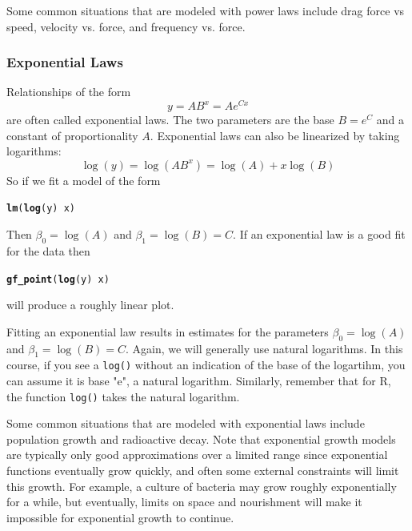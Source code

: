\documentclass[twoside]{book}\usepackage[]{graphicx}\usepackage[]{xcolor}
\makeatletter
\newcommand{\hlopt}[1]{\textcolor[rgb]{0,0,0}{#1}}%
\newcommand{\hlstd}[1]{\textcolor[rgb]{0.345,0.345,0.345}{#1}}%
\newcommand{\hlkwd}[1]{\textcolor[rgb]{0.737,0.353,0.396}{\textbf{#1}}}%
\newenvironment{kframe}{%
 \def\at@end@of@kframe{}%
 \ifinner\ifhmode%
  \def\at@end@of@kframe{\end{minipage}}%
  \begin{minipage}{\columnwidth}%
 \fi\fi%
 \def\FrameCommand##1{\hskip\@totalleftmargin \hskip-\fboxsep
 \colorbox{shadecolor}{##1}\hskip-\fboxsep
     \hskip-\linewidth \hskip-\@totalleftmargin \hskip\columnwidth}%
 \MakeFramed {\advance\hsize-\width
   \@totalleftmargin\z@ \linewidth\hsize
   \@setminipage}}%
 {\par\unskip\endMakeFramed%
 \at@end@of@kframe}
\newenvironment{knitrout}{}{} %
\newcounter{example}[section]
\makeatother
\begin{document}
Some common situations that are modeled with power laws include drag force vs speed, 
velocity vs. force, and frequency vs. force.

\subsubsection{Exponential Laws}

Relationships of the form 
\[ y = A B^x = A e^{Cx} \]
are often called exponential laws.  
The two parameters are the base $B = e^C$ and a constant of proportionality $A$.
Exponential laws can also be linearized by taking logarithms:
\[ \log(y) = \log(A B^x) = \log(A) + x \log(B) \]
So if we fit a model of the form
\begin{knitrout}
\color{fgcolor}\begin{kframe}
\begin{alltt}
\hlkwd{lm}\hlstd{(}\hlkwd{log}\hlstd{(y)} \hlopt{~} \hlstd{x)}
\end{alltt}
\end{kframe}
\end{knitrout}
Then $\beta_0 = \log(A)$ and $\beta_1 = \log(B) = C$.  
If an exponential law is a good fit for the data then
\begin{knitrout}
\color{fgcolor}\begin{kframe}
\begin{alltt}
\hlkwd{gf_point}\hlstd{(} \hlkwd{log}\hlstd{(y)} \hlopt{~} \hlstd{x )}
\end{alltt}
\end{kframe}
\end{knitrout}
will produce a roughly linear plot.

Fitting an exponential law results in estimates for the parameters $\beta_0 = \log(A)$ and $\beta_1 = \log(B) = C$.
Again, we will generally use natural logarithms. In this course, if you see a \texttt{log()} without an indication of the base of the logartihm, you can assume it is base "e", a natural logarithm.  Similarly, remember that for R, the function \texttt{log()} takes the natural logarithm.

Some common situations that are modeled with exponential laws include
population growth and radioactive decay.  Note that exponential growth models
are typically only good approximations over a limited range since exponential
functions eventually grow quickly, and often some external constraints will
limit this growth.  For example, a culture of bacteria may grow roughly
exponentially for a while, but eventually, limits on space and nourishment will
make it impossible for exponential growth to continue.
\end{document}
